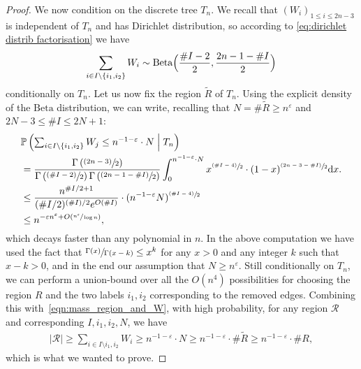 \documentclass[JEP,XML,SOM,Unicode,NoFloatCountersInSection,published]{cedram}
\newcommand{\psfrac}[2]{\sfrac{(#1)}{#2}}
\newcommand{\Ppsq}[2]{\mathbb{P} \left(#1\mathrel{}\middle|\mathrel{}#2\right)}
\newcommand{\Rr}{\mathcal{R}}
\let\eps\varepsilon
\theoremstyle{plain}
\theoremstyle{definition}
\begin{document}
\begin{proof}
We now condition on the discrete tree $T_n$. We recall that $(W_i)_{1\leq i \leq 2n-3}$ is independent of $T_n$ and has Dirichlet distribution, so according to \eqref{eq:dirichlet distrib factorisation} we have
\begin{align*}
\sum_{i\in I \setminus \{i_1,i_2\}} W_i
\sim \mathrm{Beta}\Bigl(\frac{\#I -2}{2},\frac{2n-1-\#I}{2}\Bigr)
\end{align*}
conditionally on $T_n$. Let us now fix the region $\tilde{R}$ of $T_n$. Using the explicit density of the $\mathrm{Beta}$ distribution, we can write, recalling that $N = \# \tilde{R} \geq n^\eps$ and $2N-3 \leq \# I \leq 2N+1$:
\begin{align*}
&\Ppsq{\textstyle\sum_{i\in I \setminus \{i_1,i_2\}} W_j \leq n^{-1-\eps}\cdot N}{T_n}\\
&= \frac{\Gamma\left(\psfrac{2n-3}{2}\right)}{\Gamma\left(\psfrac{\#I -2}{2}\right)\Gamma\left(\psfrac{2n-1-\#I}{2}\right)} \int_0^{n^{-1-\eps}\cdot N} x^{\psfrac{\#I -4}{2}} \cdot (1-x)^{\psfrac{2n-3-\#I}{2}} \mathrm{d}x.\\
&\leq \frac{n^{\#I/2+1}}{(\#I/2)^{(\#I)/2} e^{O(\#I)}} \cdot (n^{-1-\eps} N)^{\psfrac{\# I-4}{2}}\\
&\leq n^{-\eps n^{\eps}+O(\sfrac{n^\eps}{\log n})},
\end{align*}
which decays faster than any polynomial in $n$.
In the above computation we have used the fact that $\sfrac{\Gamma(x)}{\Gamma(x-k)}\leq x^k$ for any $x>0$ and any integer $k$ such that $x-k >0$, and in the end our assumption that $N\geq n^\eps$.
Still conditionally on $T_n$, we can perform a union-bound over all the $O(n^{4})$ possibilities for choosing the region $R$ and the two labels $i_1,i_2$ corresponding to the removed edges. Combining this with~\eqref{eqn:mass_region_and_W}, with high probability, for any region $\Rr$ and corresponding $I,i_1,i_2,N$, we have
\begin{align*}
|\Rr| \geq \sum_{i\in I\setminus {i_1,i_2}} W_i \geq n^{-1-\eps}\cdot N \geq n^{-1-\eps}\cdot \# \tilde{R} \geq n^{-1-\eps}\cdot \# R ,
\end{align*}
which is what we wanted to prove.
\end{proof}

\label{subsec:aldous recursive decomposition}
\end{document}
